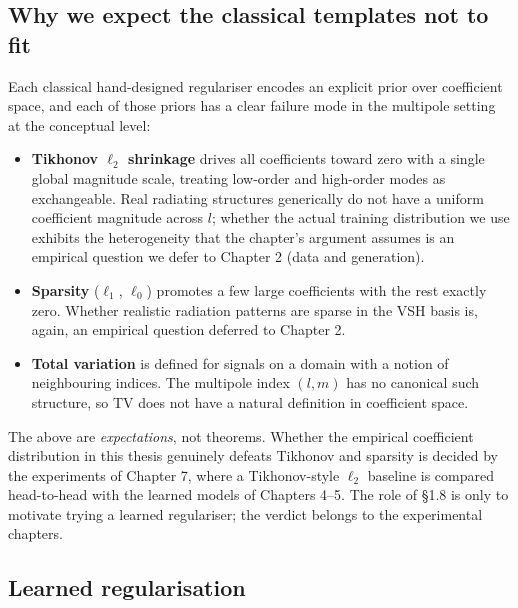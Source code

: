\documentclass[11pt,a4paper]{report}
\begin{document}
\subsection*{Why we expect the classical templates not to fit}

Each classical hand-designed regulariser encodes an explicit prior over coefficient
space, and each of those priors has a clear failure mode in the multipole setting at
the conceptual level:
\begin{itemize}
\item \textbf{Tikhonov $\ell_2$ shrinkage} drives all coefficients toward zero with
a single global magnitude scale, treating low-order and high-order modes as
exchangeable. Real radiating structures generically do not have a uniform
coefficient magnitude across $l$; whether the actual training distribution we use
exhibits the heterogeneity that the chapter's argument assumes is an empirical
question we defer to Chapter 2 (data and generation).
\item \textbf{Sparsity} ($\ell_1$, $\ell_0$) promotes a few large coefficients with
the rest exactly zero. Whether realistic radiation patterns are sparse in the VSH
basis is, again, an empirical question deferred to Chapter 2.
\item \textbf{Total variation} is defined for signals on a domain with a notion of
neighbouring indices. The multipole index $(l,m)$ has no canonical such structure,
so TV does not have a natural definition in coefficient space.
\end{itemize}
The above are \emph{expectations}, not theorems. Whether the empirical coefficient
distribution in this thesis genuinely defeats Tikhonov and sparsity is decided by
the experiments of Chapter 7, where a Tikhonov-style $\ell_2$ baseline is compared
head-to-head with the learned models of Chapters 4--5. The role of \S1.8 is only
to motivate trying a learned regulariser; the verdict belongs to the experimental
chapters.

\subsection*{Learned regularisation}
\end{document}
